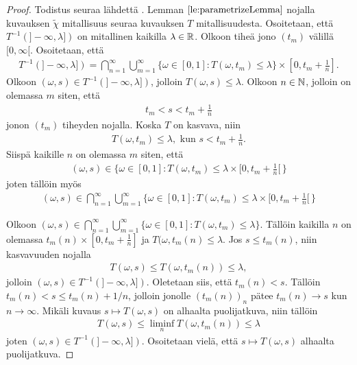 \documentclass[12pt,oneside,a4paper]{amsbook} %
\begin{document}
\begin{proof}
    Todistus seuraa lähdettä \cite[s.40]{optimal}. Lemman $\ref{le:parametrizeLemma}$ nojalla kuvauksen $\tilde \chi$ mitallisuus seuraa kuvauksen $T$ mitallisuudesta. Osoitetaan, että $T^{-1}(]-\infty, \lambda])$ on mitallinen kaikilla $\lambda \in \mathbb{R}$. Olkoon tiheä jono $(t_m)$ välillä $[0, \infty[$. Osoitetaan, että
    \begin{align*}
        T^{-1}(]-\infty, \lambda]) = \bigcap_{n=1}^\infty \bigcup_{m=1}^\infty \{\omega \in [0, 1] : T(\omega, t_m) \le \lambda\} \times [0, t_m + \frac{1}{n}].
    \end{align*}
    Olkoon $(\omega, s) \in T^{-1}(]-\infty, \lambda])$, jolloin $T(\omega, s) \le \lambda$. Olkoon $n \in \mathbb{N}$, jolloin on olemassa $m$ siten, että 
    \begin{align*}
        t_m < s < t_m + \frac{1}{n}
    \end{align*}
    jonon $(t_m)$ tiheyden nojalla. Koska $T$ on kasvava, niin
    \begin{align*}
        T(\omega, t_m) \le \lambda, \text{ kun } s < t_m + \frac{1}{n}.
    \end{align*}
    Siispä kaikille $n$ on olemassa $m$ siten, että
    \begin{align*}
        (\omega, s) \in \{\omega \in [0, 1] : T(\omega, t_m) \le \lambda \times [0, t_m + \frac{1}{n}[ \, \}
    \end{align*}
    joten tällöin myös
    \begin{align*}
        (\omega, s) \in \bigcap_{n=1}^\infty \bigcup_{m=1}^\infty\{\omega \in [0, 1] : T(\omega, t_m) \le \lambda \times [0, t_m + \frac{1}{n}[ \, \}
    \end{align*}

    Olkoon $(\omega, s) \in \bigcap_{n=1}^\infty \bigcup_{m=1}^\infty \{\omega \in [0, 1] : T(\omega, t_m) \le \lambda\}.$ Tällöin kaikilla $n$ on olemassa $t_m(n) \times [0, t_m + \frac{1}{n}]$ ja $T(\omega, t_m(n) \le \lambda$. Jos $s \le t_m(n)$, niin kasvavuuden nojalla 
    \begin{align*}
        T(\omega, s) \le T(\omega, t_m(n)) \le \lambda,
    \end{align*}
    jolloin $(\omega, s) \in T^{-1}(]-\infty, \lambda])$. Oletetaan siis, että $t_m(n) < s$. Tällöin $t_m(n) < s \le t_m(n) + 1/n$, jolloin jonolle $(t_m(n))_n$ pätee $t_m(n) \to s$ kun $n \to \infty$. Mikäli kuvaus $s \mapsto T(\omega, s)$ on alhaalta puolijatkuva, niin tällöin
    \begin{align*}
        T(\omega, s) \le \liminf_n T(\omega, t_m(n)) \le \lambda
    \end{align*}
    joten $(\omega, s) \in T^{-1}(]-\infty, \lambda])$. Osoitetaan vielä, että $s \mapsto T(\omega, s)$ alhaalta puolijatkuva.
    

\end{proof}
\end{document}
